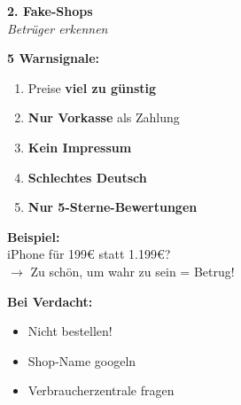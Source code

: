\documentclass[a4paper,landscape,8pt]{extarticle}
\begin{document}
\hfill%
\begin{minipage}[t]{0.32\linewidth}
\begin{center}
\colorbox{warnred!15}{%
\begin{minipage}{0.95\linewidth}
\vspace{2mm}
\begin{center}
{\Large\bfseries\textcolor{warnred}{2. Fake-Shops}}\\[1pt]
{\footnotesize\itshape Betrüger erkennen}
\end{center}
\vspace{2mm}
\end{minipage}%
}
\end{center}

\vspace{1mm}

\textbf{5 Warnsignale:}
\begin{enumerate}
\item Preise \textbf{viel zu günstig}
\item \textbf{Nur Vorkasse} als Zahlung
\item \textbf{Kein Impressum}
\item \textbf{Schlechtes Deutsch}
\item \textbf{Nur 5-Sterne-Bewertungen}
\end{enumerate}

\textbf{Beispiel:}\\
{\footnotesize iPhone für 199\euro{} statt 1.199\euro{}? \\
$\rightarrow$ Zu schön, um wahr zu sein = Betrug!}

\vspace{2mm}

\vspace{2mm}

\textbf{Bei Verdacht:}
\begin{itemize}
\item Nicht bestellen!
\item Shop-Name googeln
\item Verbraucherzentrale fragen
\end{itemize}

\end{minipage}%
\hfill%
\end{document}
